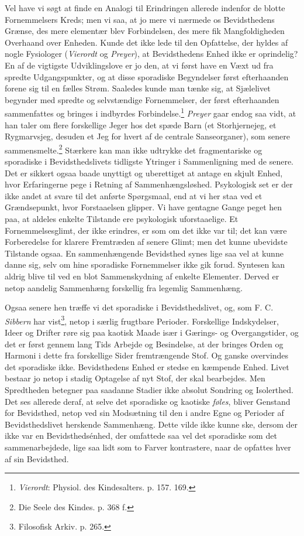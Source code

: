 \documentclass[12pt,a4paper,openany]{book}
\newcommand{\opage}[1]{\marginnote{\footnotesize\textit{[#1]}}}
\begin{document}
Vel have vi søgt at finde en Analogi til Erindringen allerede indenfor
de blotte Fornemmelsers Kreds; men vi saa, at jo mere vi nærmede os
Bevidsthedens Grænse, des mere elementær blev Forbindelsen, des mere fik
Mangfoldigheden Overhaand over Enheden. Kunde det ikke lede til den
Opfattelse, der hyldes af nogle Fysiologer (\emph{Vierordt} og
\emph{Preyer}), at Bevidsthedens Enhed ikke er oprindelig? En af de
vigtigste Udviklingslove er jo den, at vi først have en Væxt ud fra
spredte Udgangspunkter, og at disse sporadiske Begyndelser først
efterhaanden forene sig til en fælles Strøm. Saaledes
\opage{171}kunde man tænke sig, at Sjælelivet begynder med spredte og
selvstændige Fornemmelser, der først efterhaanden sammenfattes og
bringes i indbyrdes Forbindelse.\footnote[1]{\emph{Vierordt}: Physiol.
des Kindesalters. p. 157. 169.} \emph{Preyer} gaar endog saa vidt, at
han taler om flere forskellige Jeger hos det spæde Barn (et
Storhjernejeg, et Rygmarvsjeg, desuden et Jeg for hvert af de centrale
Sanseorganer), som senere sammensmelte.\footnote[2]{Die Seele des
Kindes. p. 368 f.} Stærkere kan man ikke udtrykke det fragmentariske og
sporadiske i Bevidsthedslivets tidligste Ytringer i Sammenligning med de
senere. Det er sikkert ogsaa baade unyttigt og uberettiget at antage en
skjult Enhed, hvor Erfaringerne pege i Retning af Sammenhængsløshed.
Psykologisk set er der ikke andet at svare til det anførte Spørgsmaal,
end at vi her staa ved et Grændsepunkt, hvor Forstaaelsen glipper. Vi
have gentagne Gange peget hen paa, at aldeles enkelte Tilstande ere
psykologisk uforstaaelige. Et Fornemmelsesglimt, der ikke erindres, er
som om det ikke var til; det kan være Forberedelse for klarere
Fremtræden af senere Glimt; men det kunne ubevidste Tilstande ogsaa. En
sammenhængende Bevidsthed synes lige saa vel at kunne danne sig, selv om
hine sporadiske Fornemmelser ikke gik forud. Syntesen kan aldrig blive
til ved en blot Sammenskydning af enkelte Elementer. Derved er netop
aandelig Sammenhæng forskellig fra legemlig Sammenhæng.

Ogsaa senere hen træffe vi det sporadiske i Bevidsthedslivet, og, som F.
C. \emph{Sibbern} har vist\footnote[3]{Filosofisk Arkiv. p. 265.}, netop
i særlig frugtbare Perioder. Forskellige Indskydelser, Ideer og Drifter
røre sig paa kaotisk Maade især i Gærings- og Overgangstider, og det er
først gennem lang Tids Arbejde og Besindelse, at der bringes Orden og
Harmoni i dette fra forskellige Sider fremtrængende Stof. Og ganske
overvindes det sporadiske ikke. Bevidsthedens Enhed er stedse en
kæmpende Enhed. Livet bestaar jo netop i stadig Optagelse af nyt Stof,
der skal bearbejdes. Men Spredtheden betegner paa saadanne Stadier ikke
absolut Sondring og Isolerthed. Det ses allerede deraf, at selve det
sporadiske og kaotiske \emph{føles}, bliver Genstand for Bevidsthed,
netop ved sin Modsætning til den i andre
\opage{172}Egne og Perioder af Bevidsthedslivet herskende Sammenhæng.
Dette vilde ikke kunne ske, dersom der ikke var en Bevidsthedsénhed, der
omfattede saa vel det sporadiske som det sammenarbejdede, lige saa lidt
som to Farver kontrastere, naar de opfattes hver af sin Bevidsthed.
\end{document}
